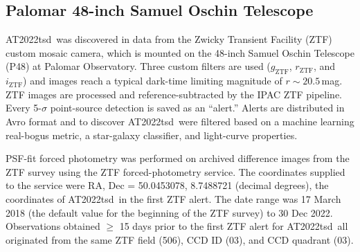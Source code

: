 \documentclass{nature_plusfigure}
\newcommand{\at}{AT2022tsd}
\begin{document}
\begin{methods}
\subsection{Palomar 48-inch Samuel Oschin Telescope}

\at\ was discovered in data from the Zwicky Transient Facility (ZTF) custom mosaic camera\cite{Dekany2020}, which is mounted on the 48-inch Samuel Oschin Telescope (P48) at Palomar Observatory.
Three custom filters are used ($g_{\mathrm{ZTF}}$, $r_{\mathrm{ZTF}}$, and $i_{\mathrm{ZTF}}$\cite{Dekany2020})
and images reach a typical dark-time limiting magnitude of $r\sim20.5\,$mag.
ZTF images are processed and reference-subtracted
by the IPAC ZTF pipeline\cite{Masci2019}.
Every 5-$\sigma$ point-source detection is saved as an ``alert.''
Alerts are distributed in Avro format\cite{Patterson2019} and to discover \at\ were filtered based on a machine learning real-bogus metric\cite{Duev2019}, a star-galaxy classifier\cite{Tachibana2018}, and light-curve properties.

PSF-fit forced photometry was performed on archived difference images from the ZTF survey using the ZTF forced-photometry service\cite{Masci2019}. The coordinates supplied to the service were RA, Dec = 50.0453078, 8.7488721 (decimal degrees), the coordinates of \at\ in the first ZTF alert. The date range was 17 March 2018 (the default value for the beginning of the ZTF survey) to 30 Dec 2022.
Observations obtained $\geq$ 15 days prior to the first ZTF alert for \at\ all originated from the same ZTF field (506), CCD ID (03), and CCD quadrant (03). 


\end{methods}
\end{document}
